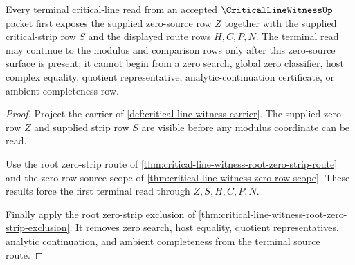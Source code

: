 \begin{theorem}
\label{thm:critical-line-witness-terminal-zero-source-totality}
Every terminal critical-line read from an accepted $\CriticalLineWitnessUp$ packet first exposes the supplied zero-source row $Z$ together with the supplied critical-strip row $S$ and the displayed route rows $H,C,P,N$. The terminal read may continue to the modulus and comparison rows only after this zero-source surface is present; it cannot begin from a zero search, global zero classifier, host complex equality, quotient representative, analytic-continuation certificate, or ambient completeness row.
\end{theorem}
\begin{proof}
Project the carrier of \autoref{def:critical-line-witness-carrier}. The supplied zero row $Z$ and supplied strip row $S$ are visible before any modulus coordinate can be read.

Use the root zero-strip route of \autoref{thm:critical-line-witness-root-zero-strip-route} and the zero-row source scope of \autoref{thm:critical-line-witness-zero-row-scope}. These results force the first terminal read through $Z,S,H,C,P,N$.

Finally apply the root zero-strip exclusion of \autoref{thm:critical-line-witness-root-zero-strip-exclusion}. It removes zero search, host equality, quotient representatives, analytic continuation, and ambient completeness from the terminal source route.
\end{proof}

